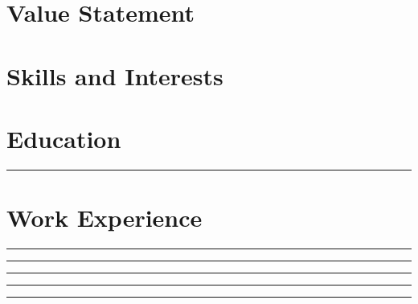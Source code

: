 \documentclass[letterpaper,10pt]{article} %
\begin{document}
\pagestyle{empty} %


\section{Value Statement}

\bigskip

\section{Skills and Interests}

\bigskip

\section{Education}
\bigskip


\rule{\textwidth}{.2pt}

\bigskip

\section{Work Experience}

\bigskip

\rule{\textwidth}{.2pt}

\bigskip

\rule{\textwidth}{.2pt}

\bigskip

\rule{\textwidth}{.2pt}

\bigskip

\rule{\textwidth}{.2pt}

\bigskip

\rule{\textwidth}{.2pt}

\bigskip
\end{document}
